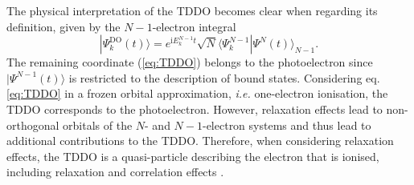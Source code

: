 The physical interpretation of the TDDO becomes clear when regarding its definition, given by the $N-1$-electron integral
\begin{equation} \label{eq:TDDO}
|\Psi_k^\text{DO}(t)\rangle =  e^{\text{i}E_k^{N-1}t}\sqrt{N} \langle \Psi_k^{N-1} |\Psi^N(t) \rangle_{N-1}.
\end{equation}
The remaining coordinate (\ref{eq:TDDO}) belongs to the photoelectron since $|\Psi^{N-1}(t)\rangle$ is restricted to the description of bound states.
Considering eq. \ref{eq:TDDO} in a frozen orbital approximation, \textit{i.e.} one-electron ionisation, the TDDO corresponds to the photoelectron.
However, relaxation effects lead to non-orthogonal orbitals of the $N$- and $N-1$-electron systems and thus lead to additional contributions to the TDDO.
Therefore, when considering relaxation effects, the TDDO is a quasi-particle describing the electron that is ionised, including relaxation and correlation effects \cite{ezDyson,TD-do}.

